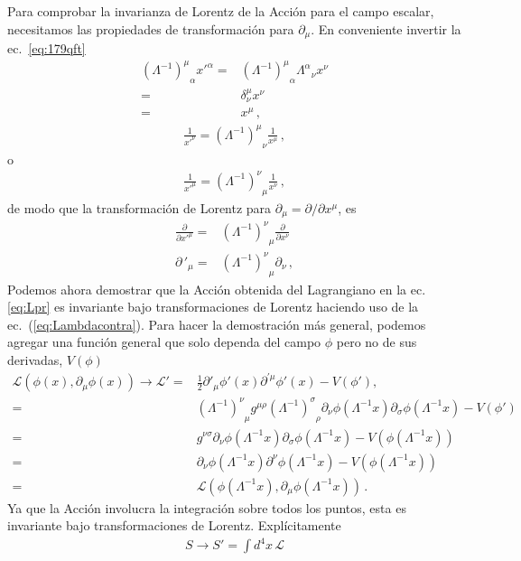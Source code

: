 Para comprobar la invarianza de Lorentz de la Acción para el campo escalar, necesitamos las propiedades de transformación para $\partial_\mu$. En conveniente invertir la ec.~\eqref{eq:179qft}
\begin{align}
  {\left(\Lambda^{-1}\right)^\mu}_\alpha{x'}^\alpha=&{\left(\Lambda^{-1}\right)^\mu}_\alpha{\Lambda^\alpha}_\nu x^\nu\nonumber\\
=&\delta^\mu_\nu x^\nu\nonumber\\
=&x^\mu\,,
\end{align}
\begin{align}
  \frac{1}{{x'}^\nu}= {\left(\Lambda^{-1}\right)^\mu}_\nu\frac{1}{x^\mu}\,,
\end{align}
o
\begin{align}
  \label{eq:183qft}
    \frac{1}{{x'}^\mu}= {\left(\Lambda^{-1}\right)^\nu}_\mu\frac{1}{x^\nu}\,,
\end{align}
de modo que la transformación de Lorentz para $\partial_\mu=\partial/\partial x^\mu$, es
\begin{align}
  \label{dmulrtran}
   \frac{\partial}{{\partial x'}^\mu}=& {\left(\Lambda^{-1}\right)^\nu}_\mu\frac{\partial}{\partial x^\nu}\nonumber\\
   {\partial\,}'_\mu=& {\left(\Lambda^{-1}\right)^\nu}_\mu\partial_\nu\,,
\end{align}
Podemos ahora demostrar que la Acción obtenida del Lagrangiano en la ec.\eqref{eq:Lpr} es invariante bajo transformaciones de Lorentz haciendo uso de la ec.~(\ref{eq:Lambdacontra}). Para hacer la demostración más general, podemos agregar una función general que solo dependa del campo $\phi$ pero no de sus derivadas, $V(\phi)$
\begin{align}
  \mathcal{L}(\phi(x),\partial_{\mu}\phi(x))\to  \mathcal{L}'=& \frac{1}{2}\partial'_\mu\phi'(x)\partial^{'\mu}\phi'(x)-V(\phi'), \nonumber\\
  =&{\left(\Lambda^{-1}\right)^\nu}_\mu g^{\mu \rho}{\left(\Lambda^{-1}\right)^\sigma}_\rho \partial_\nu\phi(\Lambda^{-1}x) \partial_\sigma \phi(\Lambda^{-1}x) -V(\phi')\nonumber\\
  =& g^{\nu \sigma}\partial_\nu\phi(\Lambda^{-1}x) \partial_\sigma \phi(\Lambda^{-1}x) -V(\phi(\Lambda^{-1}x))\nonumber\\
  =& \partial_\nu\phi(\Lambda^{-1}x) \partial^{\nu} \phi(\Lambda^{-1}x) -V(\phi(\Lambda^{-1}x)) \nonumber\\
  =&\mathcal{L}(\phi(\Lambda^{-1}x),\partial_{\mu}\phi(\Lambda^{-1}x))\,.
\end{align}
Ya que la Acción involucra la integración sobre todos los puntos, esta es invariante bajo transformaciones de Lorentz. Explícitamente
\begin{align}
  S\to S'=\int d^4x\, \mathcal{L}
\end{align}

